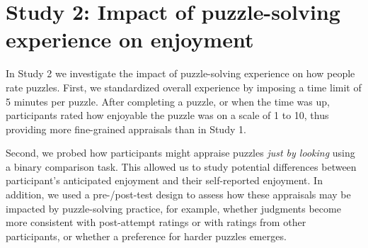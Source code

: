 \documentclass[10pt,letterpaper]{article}
\begin{document}


\section{Study 2: Impact of puzzle-solving experience on enjoyment}

In Study 2 we investigate the impact of puzzle-solving experience on how people rate puzzles. First, we standardized overall experience by imposing a time limit of 5 minutes per puzzle. After completing a puzzle, or when the time was up, participants rated how enjoyable the puzzle was on a scale of 1 to 10, thus providing more fine-grained appraisals than in Study 1.

Second, we probed how participants might appraise puzzles \textit{just by looking} using a binary comparison task. This allowed us to study potential differences between participant's anticipated enjoyment and their self-reported enjoyment. 
In addition, we used a pre-/post-test design to assess how these appraisals may be impacted by puzzle-solving practice, for example, whether judgments become more consistent with post-attempt ratings or with ratings from other participants, or whether a preference for harder puzzles emerges.
\end{document}
